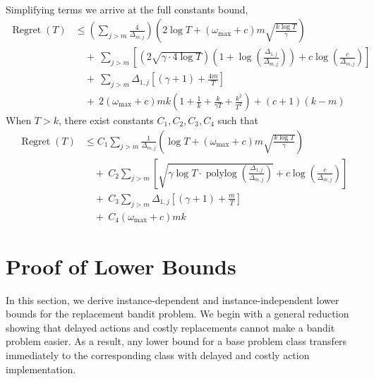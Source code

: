 \documentclass[opre,blindrev]{informs3}
\newcommand{\polylog}{\operatorname{polylog}}
\newcommand{\Regret}{\operatorname{Regret}}
\begin{document}
\begin{APPENDICES}
\begin{align*}
    \end{align*}
    Simplifying terms we arrive at the full constants bound,
    \begin{align*}
        \Regret(T)&\leq \left(\sum_{j>m}\frac{4}{\Delta_{m,j}}\right) \left( 2\log T+(\omega_{\max}+c)m\sqrt{\frac{k\log T}{\gamma }}\right)\\
        &\quad +~ \sum_{j>m} \left[\left(2\sqrt{\gamma \cdot 4\log T}\right)\left(1+\log\left(\frac{\Delta_{1,j}}{\Delta_{m,j}}\right)\right)+c\log\left(\frac{c}{\Delta_{m,j}}\right)\right]\\
        & \quad + ~\sum_{j>m} \Delta_{1,j} \left[(\gamma + 1) + \frac{4m}{T}\right]\\
        &\quad +~2(\omega_{\max}+c)mk\left(1+\frac{1}{k}+\frac{k}{\gamma T}+\frac{k^2}{T^2}\right) + (c+1)(k-m)
    \end{align*}
    When \(T>k\), there exist constants \(C_1, C_2, C_3, C_4\) such that
    \begin{align*}
        \Regret(T)&\leq C_1\sum_{j>m}\frac{1}{\Delta_{m,j}} \left( \log T+(\omega_{\max}+c)m\sqrt{\frac{k\log T}{\gamma }}\right)\\
        &\quad +~ C_2\sum_{j>m} \left[\sqrt{\gamma \log T\cdot \polylog\left(\frac{\Delta_{1,j}}{\Delta_{m,j}}\right)}+c\log\left(\frac{c}{\Delta_{m,j}}\right)\right]\\
        & \quad + ~C_3\sum_{j>m} \Delta_{1,j} \left[(\gamma + 1) + \frac{m}{T}\right]\\
        &\quad +~C_4(\omega_{\max}+c)mk
    \end{align*}
\Halmos


\section{Proof of Lower Bounds}\label{sec:lower_bounds}
In this section, we derive instance-dependent and instance-independent lower bounds for the replacement bandit problem. We begin with a general reduction showing that delayed actions and costly replacements cannot make a bandit problem easier. As a result, any lower bound for a base problem class transfers immediately to the corresponding class with delayed and costly action implementation.


\end{APPENDICES}
\end{document}
